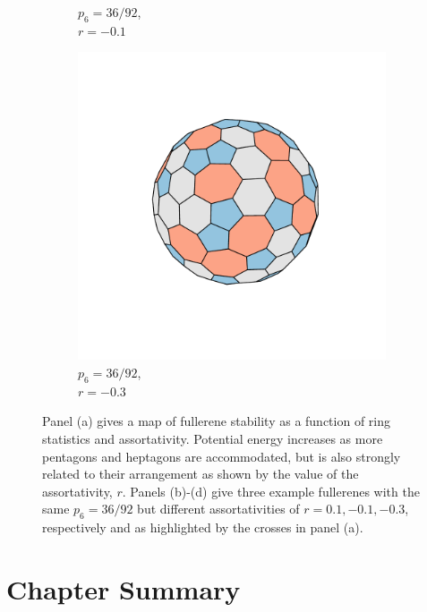 \begin{figure}[bt]
\begin{subfigure}[b]{0.2\textwidth}
         \caption{$p_6=36/92$,\\ $r=-0.1$}
         \label{fig:fullerene92b}
     \end{subfigure}
     \hfill
     \begin{subfigure}[b]{0.2\textwidth}
         \centering
         \includegraphics[width=\textwidth]{./figures/general_networks/full92_r-30.pdf}
         \caption{$p_6=36/92$,\\ $r=-0.3$}
         \label{fig:fullerene92c}
     \end{subfigure}
     \hfill
     
     \caption{Panel (a) gives a map of fullerene stability as a function of ring statistics and assortativity.
        Potential energy increases as more pentagons and heptagons are accommodated, but is also strongly related to their arrangement as shown by the value of the assortativity, $r$.
        Panels (b)-(d) give three example fullerenes with the same $p_6=36/92$ but different assortativities of $r=0.1,-0.1,-0.3$, respectively and as highlighted by the crosses in panel (a).}
     \label{fig:fullerene92}
\end{figure}

\section{Chapter Summary}

